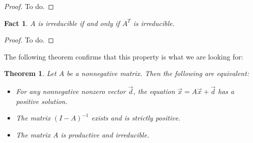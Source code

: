 \documentclass{article}
\theoremstyle{definition}
\theoremstyle{plain}
\theoremstyle{theorem}
\newtheorem{fact}{Fact}[section]
\newtheorem{theorem}{Theorem}[section]
\begin{document}
\begin{proof}
	To do. 
\end{proof}
\begin{fact}
	$A$ is irreducible if and only if $A^T$ is irreducible.
\end{fact}
\begin{proof}
	To do.
\end{proof}
The following theorem confirms that this property is what we are looking for:
\begin{theorem}
	Let $A$ be a nonnegative matrix. Then the following are equivalent:
	\begin{itemize}	
		\item[(i)] For any nonnegative nonzero vector $\vec{d}$, the equation $\vec{x} = A\vec{x}+\vec{d}$ has a positive solution.
		\item[(ii)] The matrix $(I-A)^{-1}$ exists and is strictly positive. 
		\item[(iii)] The matrix $A$ is productive and irreducible. 
	\end{itemize}
\end{theorem}
\end{document}
